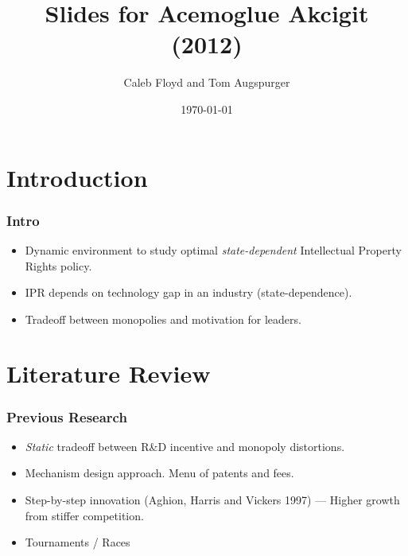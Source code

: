 \documentclass{beamer}
\title{Slides for Acemoglue Akcigit (2012)}
\author{Caleb Floyd and Tom Augspurger}
\date{\today}
\begin{document}
\frame{\titlepage}




\section{Introduction}
\label{sec:introduction}

\begin{frame}[t]\frametitle{Intro}
  \begin{itemize}
    \item<+-> Dynamic environment to study optimal \emph{state-dependent} Intellectual Property Rights policy.
    \item<+-> IPR depends on technology gap in an industry (state-dependence).
    \item<+-> Tradeoff between monopolies and motivation for leaders.
  \end{itemize}
\end{frame}

\section{Literature Review}
\label{sec:literature_review}
\begin{frame}[t]\frametitle{Previous Research} 
  \begin{itemize}
    \item<+-> \emph{Static} tradeoff between R\&D incentive and monopoly distortions.
    \item<+-> Mechanism design approach.  Menu of patents and fees.
    \item<+-> Step-by-step innovation (Aghion, Harris and Vickers 1997) --- Higher growth from stiffer competition.
    \item<+-> Tournaments / Races
  \end{itemize}  
\end{frame}
\end{document}
